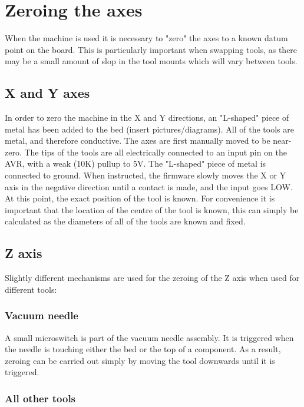 \section{Zeroing the axes}

When the machine is used it is necessary to "zero" the axes to a known datum point on the board. This is particularly important when swapping tools, as there may
be a small amount of slop in the tool mounts which will vary between tools.

\subsection{X and Y axes}

In order to zero the machine in the X and Y directions, an "L-shaped" piece of metal has been added to the bed (insert pictures/diagrams). All of the tools are metal,
and therefore conductive. The axes are first manually moved to be near-zero. The tips of the tools are all electrically connected to an input pin on the AVR, with a weak (10K) pullup to 5V.
The "L-shaped" piece of metal is connected to ground. When instructed, the firmware slowly moves the X or Y axis in the negative direction until a contact is made, and the input goes LOW. At this point,
the exact position of the tool is known. For convenience it is important that the location of the centre of the tool is known, this can simply be calculated as the diameters of all of the tools are known and fixed.

\subsection{Z axis}

Slightly different mechanisms are used for the zeroing of the Z axis when used for different tools:

\subsubsection{Vacuum needle}

A small microswitch is part of the vacuum needle assembly. It is triggered when the needle is touching either the bed or the top of a component. As a result, zeroing can be carried out simply by 
moving the tool downwards until it is triggered.

\subsubsection{All other tools}

